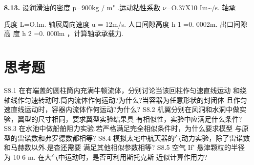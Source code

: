 \noindent\textbf{8.13.} 设润滑油的密度 p=900kg / m" .运动粘性系数 $\nu$=O.37X10 Im\textasciitilde{}/s. 轴承

氏度 L=O.lm. 轴展周向速度 u = 12m/s. 人口间隙高度 h 1 =0. 0002m. 出口间隙高 度 h 2 =0. 000lm ，计算轴承承载力.

\section*{思考题}

S8.1 在有端盖的圆柱筒内充满牛顿流体，分别讨论当该回柱作匀速直线运动 和绕轴线作匀速转动时.筒内流体作何运动?为什么?当容器为任意形状的封闭体 且作匀速直线运动时，容器内流体作何运动?为什么? S8.2 机翼分别在风洞和水洞中做实验，翼型的尺寸相同，要求翼型实验结果具 有相似性，实验中应满足什么条件? S8.3 在水池中做船舶阻力实验.若严格满足完全相似条件时，为什么要求模型 与原型的雷诺数和弗罗德数都相等? S8.4 模拟太宅中航天器的气动力实验，除了雷诺数和马赫数以外.是杳还需要 满足其他相似参数相等? S8.5 空气 If' 悬津颗粒的半径为 10 6 m. 在大气中运动时，是否可利用斯托克斯 近似计算作用力?
